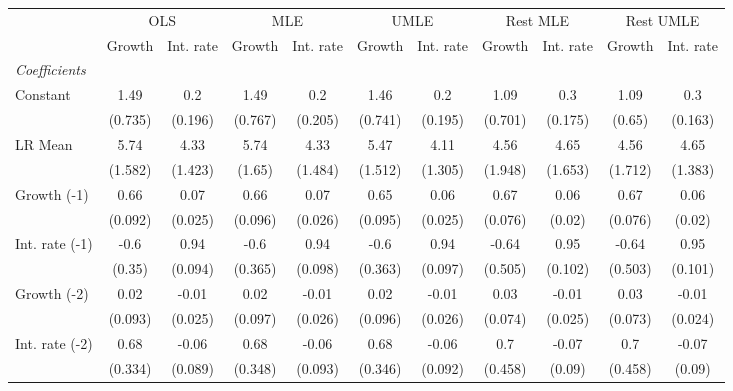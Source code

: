 \begin{table}[htbp] 
	\centering
	\begin{tabular}{@{\extracolsep{4pt}}lcccccccccc@{}}		\hline\hline
		 		 & \multicolumn{2}{c}{OLS} &\multicolumn{2}{c}{MLE} &\multicolumn{2}{c}{UMLE} &\multicolumn{2}{c}{Rest MLE} &\multicolumn{2}{c}{Rest UMLE} \\ 
 		 & Growth 	 & Int. rate 	 & Growth 	 & Int. rate 	 & Growth 	 & Int. rate 	 & Growth 	 & Int. rate 	 & Growth 	 & Int. rate\\\cline{2-3}\cline{4-5}\cline{6-7}\cline{8-9}\cline{10-11}
\rule{0pt}{4ex} 
 \emph{Coefficients} 	  		 & 		 & 		 & 		 & 		 & 		 & 		 & 		 & 		 & 		 &\\ 
\quad Constant 	 & 1.49 	 & 0.2 	 & 1.49 	 & 0.2 	 & 1.46 	 & 0.2 	 & 1.09 	 & 0.3 	 & 1.09 	 & 0.3	 \\ 
 		 & (0.735) 	 & (0.196) 	 & (0.767) 	 & (0.205) 	 & (0.741) 	 & (0.195) 	 & (0.701) 	 & (0.175) 	 & (0.65) 	 & (0.163) 	 \\ 
\quad LR Mean 	 & 5.74 	 & 4.33 	 & 5.74 	 & 4.33 	 & 5.47 	 & 4.11 	 & 4.56 	 & 4.65 	 & 4.56 	 & 4.65	 \\ 
 		 & (1.582) 	 & (1.423) 	 & (1.65) 	 & (1.484) 	 & (1.512) 	 & (1.305) 	 & (1.948) 	 & (1.653) 	 & (1.712) 	 & (1.383) 	 \\ 
\quad Growth (-1) 	 &0.66 	 & 0.07 	 & 0.66 	 & 0.07 	 & 0.65 	 & 0.06 	 & 0.67 	 & 0.06 	 & 0.67 	 & 0.06	 \\ 
 		 & (0.092) 	 & (0.025) 	 & (0.096) 	 & (0.026) 	 & (0.095) 	 & (0.025) 	 & (0.076) 	 & (0.02) 	 & (0.076) 	 & (0.02) 	 \\ 
\quad Int. rate (-1) 	 &-0.6 	 & 0.94 	 & -0.6 	 & 0.94 	 & -0.6 	 & 0.94 	 & -0.64 	 & 0.95 	 & -0.64 	 & 0.95	 \\ 
 		 & (0.35) 	 & (0.094) 	 & (0.365) 	 & (0.098) 	 & (0.363) 	 & (0.097) 	 & (0.505) 	 & (0.102) 	 & (0.503) 	 & (0.101) 	 \\ 
\quad Growth (-2) 	 &0.02 	 & -0.01 	 & 0.02 	 & -0.01 	 & 0.02 	 & -0.01 	 & 0.03 	 & -0.01 	 & 0.03 	 & -0.01	 \\ 
 		 & (0.093) 	 & (0.025) 	 & (0.097) 	 & (0.026) 	 & (0.096) 	 & (0.026) 	 & (0.074) 	 & (0.025) 	 & (0.073) 	 & (0.024) 	 \\ 
\quad Int. rate (-2) 	 &0.68 	 & -0.06 	 & 0.68 	 & -0.06 	 & 0.68 	 & -0.06 	 & 0.7 	 & -0.07 	 & 0.7 	 & -0.07	 \\ 
 		 & (0.334) 	 & (0.089) 	 & (0.348) 	 & (0.093) 	 & (0.346) 	 & (0.092) 	 & (0.458) 	 & (0.09) 	 & (0.458) 	 & (0.09) 	 \\ 

\end{tabular}
\end{table}
